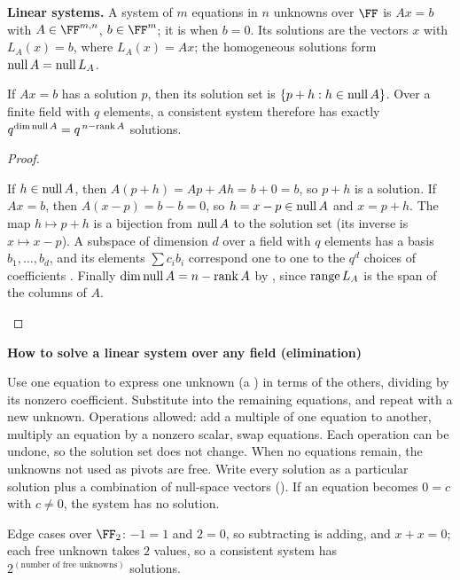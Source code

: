 \documentclass[10pt]{scrartcl}
\newenvironment{methodbox}[1]{\begin{mdframed}[style=methodstyle]\textbf{\color{NavyBlue}#1}\par\vspace{2pt}}{\end{mdframed}}
\begin{document}
\textbf{Linear systems.} A system of $m$ equations in $n$ unknowns over $\FF$ is $Ax=b$ with $A\in\FF^{m,n}$, $b\in\FF^m$; it is  when $b=0$. Its solutions are the vectors $x$ with $L_A(x)=b$, where $L_A(x)=Ax$; the homogeneous solutions form $\operatorname{null} A=\operatorname{null} L_A$.

\begin{proposition*}
  If $Ax=b$ has a solution $p$, then its solution set is $\{p+h: h\in\operatorname{null} A\}$. Over a finite field with $q$ elements, a consistent system therefore has exactly $q^{\dim\operatorname{null} A}=q^{\,n-\operatorname{rank}A}$ solutions.
\end{proposition*}
\begin{proof}
  \begin{steps}
    \ii If $h\in\operatorname{null} A$, then $A(p+h)=Ap+Ah=b+0=b$, so $p+h$ is a solution.
    \ii If $Ax=b$, then $A(x-p)=b-b=0$, so $h=x-p\in\operatorname{null} A$ and $x=p+h$.
    \ii The map $h\mapsto p+h$ is a bijection from $\operatorname{null} A$ to the solution set (its inverse is $x\mapsto x-p$). A subspace of dimension $d$ over a field with $q$ elements has a basis $b_1,\dots,b_d$, and its elements $\sum c_ib_i$ correspond one to one to the $q^d$ choices of coefficients . Finally $\dim\operatorname{null} A=n-\operatorname{rank}A$ by , since $\operatorname{range} L_A$ is the span of the columns of $A$.
  \end{steps}
\end{proof}

\begin{methodbox}{How to solve a linear system over any field (elimination)}
  \begin{steps}
    \ii Use one equation to express one unknown (a ) in terms of the others, dividing by its nonzero coefficient.
    \ii Substitute into the remaining equations, and repeat with a new unknown. Operations allowed: add a multiple of one equation to another, multiply an equation by a nonzero scalar, swap equations. Each operation can be undone, so the solution set does not change.
    \ii When no equations remain, the unknowns not used as pivots are free. Write every solution as a particular solution plus a combination of null-space vectors ().
    \ii If an equation becomes $0=c$ with $c\ne0$, the system has no solution.
  \end{steps}
  Edge cases over $\FF_2$: $-1=1$ and $2=0$, so subtracting is adding, and $x+x=0$; each free unknown takes $2$ values, so a consistent system has $2^{(\text{number of free unknowns})}$ solutions.
\end{methodbox}
\end{document}
